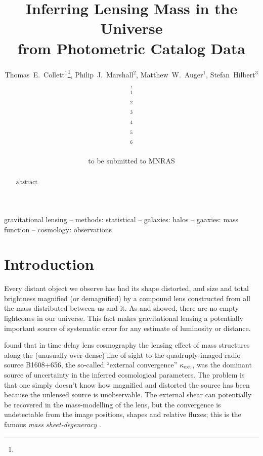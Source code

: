 \documentclass[useAMS,usenatbib]{mn2e}
\title[Line of Sight Mass Reconstruction]
{Inferring Lensing Mass in the Universe \\
from Photometric Catalog Data}
\author[Collett \etal]{%
  Thomas~E.~Collett$^{1}$\thanks{\collettemail},
  Philip~J.~Marshall$^{2}$,
  Matthew~W.~Auger$^{1}$,
  Stefan~Hilbert$^{3}$,
\newauthor{%
  Sherry~H.~Suyu$^{4}$,
  Zachary~Greene$^{4}$,
  Tommaso~Treu$^{4}$\thanks{\packard},
  Christopher~D.~Fassnacht$^{5}$,}
\newauthor{%
  L\`eon~V.~E.~Koopmans$^{6}$,
  Roger~D.~Blandford$^{3}$} 
  \medskip\\
  $^1$\ioa\\
  $^2$\oxford\\
  $^3$\kipac\\
  $^4$\ucsb\\
  $^5$\davis\\
  $^6$\kapteyn
}
\begin{document}
             
\date{to be submitted to MNRAS}
\pagerange{\pageref{firstpage}--\pageref{lastpage}}

\maketitle           

\label{firstpage}


\begin{abstract} 
abstract
\end{abstract}


\begin{keywords}
  gravitational lensing   --
  methods: statistical    --
  galaxies: halos         --
  gaaxies: mass function  --
  cosmology: observations
\end{keywords}

\setcounter{footnote}{1}


\section{Introduction}

Every distant object we observe has had its shape distorted, and size
and total brightness magnified (or demagnified) by a compound lens constructed
from all the mass distributed between us and it. As \citet{valewhite2003} and \citet{hilbert}
showed, there are no empty lightcones in our universe. This fact makes gravitational lensing a potentially important source of systematic error for any estimate of luminosity or distance.

\citet{suyu} found that in time delay lens cosmography the
lensing effect of mass structures along the (unusually over-dense) line of
sight to the quadruply-imaged radio source B1608$+$656, the so-called ``external
convergence'' $\kappa_{\rm ext}$, was the dominant source of uncertainty in the inferred
cosmological parameters. The problem is that one simply doesn't know
how magnified and distorted the source has been because the unlensed source is unobservable. The external shear can potentially be recovered in the mass-modelling of the lens, but the convergence is undetectable from the image positions, shapes and relative fluxes; this is the famous {\emph{  mass sheet-degeneracy}} \citep[see e.g.][for details]{falco}.
\end{document}
